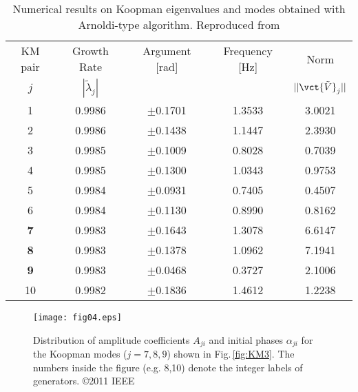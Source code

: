 \documentclass[a4paper,10pt]{article}
\begin{document}
%
\begin{table}[t] %
\begin{center}
\caption{%
Numerical results on Koopman eigenvalues and modes obtained with Arnoldi-type algorithm.  
Reproduced from \cite{Susuki_IEEETPWRS26}
}%
\label{tab:KM}
\begin{tabular}{ccccc}\hline
KM pair & Growth Rate & Argument [rad] & Frequency [Hz] & Norm \\
$j$ & $|\tilde{\lambda}_j|$ & & & $||\vct{\tilde{V}}_j||$ \\\hline
1 & 0.9986 & $\pm$0.1701 & 1.3533 & 3.0021\\
2 & 0.9986 & $\pm$0.1438 & 1.1447 & 2.3930\\
3 & 0.9985 & $\pm$0.1009 & 0.8028 & 0.7039\\
4 & 0.9985 & $\pm$0.1300 & 1.0343 & 0.9753\\
5 & 0.9984 & $\pm$0.0931 & 0.7405 & 0.4507\\
6 & 0.9984 & $\pm$0.1130 & 0.8990 & 0.8162\\
{\bf 7} & 0.9983 & $\pm$0.1643 & 1.3078 & 6.6147\\
{\bf 8} & 0.9983 & $\pm$0.1378 & 1.0962 & 7.1941\\
{\bf 9} & 0.9983 & $\pm$0.0468 & 0.3727 & 2.1006\\
10 & 0.9982 & $\pm$0.1836 & 1.4612 & 1.2238\\\hline
\end{tabular}
\end{center}
\end{table}    

%
\begin{figure}[t]
\centering
\texttt{[image: fig04.eps]}
\caption{%
Distribution of amplitude coefficients $A_{ji}$ and initial phases $\alpha_{ji}$ for the Koopman modes ($j=7,8,9$) shown in Fig.\,\ref{fig:KM3}.  
The numbers inside the figure (e.g. 8,10) denote the integer labels of generators. 
\copyright 2011 IEEE
}%
\label{fig:A}
\end{figure}
\end{document}
